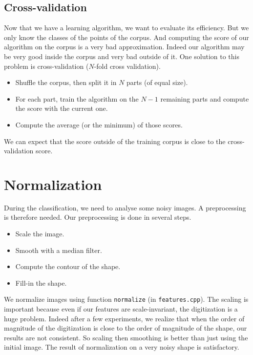 \documentclass[a4paper, 11pt]{article}
\begin{document}
\subsection{Cross-validation}

Now that we have a learning algorithm, we want to evaluate its efficiency. But we only know the classes of the points of the corpus. And computing the score of our algorithm on the corpus is a very bad approximation. Indeed our algorithm may be very good inside the corpus and very bad outside of it. One solution to this problem is cross-validation ($N$-fold cross validation).
\begin{itemize}
	\item Shuffle the corpus, then split it in $N$ parts (of equal size).
	\item For each part, train the algorithm on the $N-1$ remaining parts and compute the score with the current one.
	\item Compute the average (or the minimum) of those scores.
\end{itemize}
We can expect that the score outside of the training corpus is close to the cross-validation score.


\newpage
\section{Normalization}

During the classification, we need to analyse some noisy images. A preprocessing is therefore needed. Our preprocessing is done in several steps.
\begin{itemize}
  \item Scale the image.
  \item Smooth with a median filter.
	\item Compute the contour of the shape.
	\item Fill-in the shape.
\end{itemize}

\noindent We normalize images using function \verb|normalize| (in \verb|features.cpp|).
The scaling is important because even if our features are scale-invariant, the digitization is a huge problem. Indeed after a few experiments, we realize that when the order of magnitude of the digitization is close to the order of magnitude of the shape, our results are not consistent. So scaling then smoothing is better than just using the initial image. The result of normalization on a very noisy shape is satisfactory. 
\end{document}
